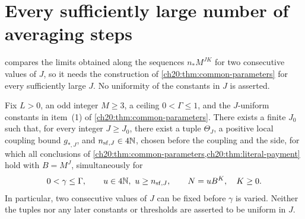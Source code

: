 \section{Every sufficiently large number of averaging steps}\label{ch20:sec:large-J}

 compares the limits obtained along the sequences $n_*M^{JK}$ for two consecutive values of $J$, so it needs the construction of \cref{ch20:thm:common-parameters} for every sufficiently large $J$. No uniformity of the constants in $J$ is asserted.

\begin{lemma}\label{ch20:lem:all-large-macro-depths}
Fix $L>0$, an odd integer $M\ge3$, a ceiling $0<\Gamma\le1$, and the $J$-uniform constants in item~\textup{(1)} of \cref{ch20:thm:common-parameters}. There exists a finite $J_0$ such that, for every integer $J\ge J_0$, there exist a tuple $\Theta_J$, a positive local coupling bound $g_{*,J}$, and $n_{\mathrm{sf},J}\in4\mathbb N$, chosen before the coupling and the side, for which all conclusions of \cref{ch20:thm:common-parameters,ch20:thm:literal-payment} hold with $B=M^J$, simultaneously for
\[
 0<\gamma\le\Gamma,\qquad u\in4\mathbb N,\ u\ge n_{\mathrm{sf},J},\qquad N=uB^K,\quad K\ge0.
\]
In particular, two consecutive values of $J$ can be fixed before $\gamma$ is varied. Neither the tuples nor any later constants or thresholds are asserted to be uniform in $J$.
\end{lemma}

